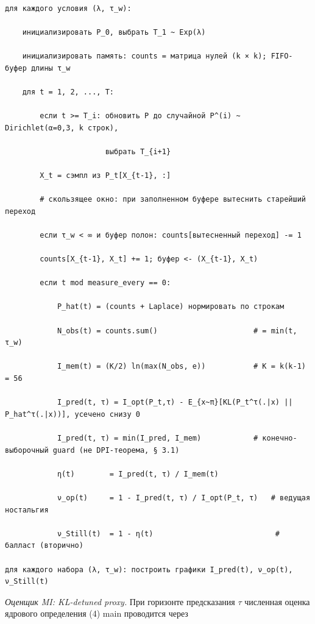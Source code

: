 \documentclass[pdflatex,sn-mathphys-ay]{sn-jnl}
\begin{document}
\begingroup\footnotesize\linespread{1}\selectfont
\begin{Verbatim}[breaklines=true]

для каждого условия (λ, τ_w):

    инициализировать P_0, выбрать T_1 ~ Exp(λ)

    инициализировать память: counts = матрица нулей (k × k); FIFO-буфер длины τ_w

    для t = 1, 2, ..., T:

        если t >= T_i: обновить P до случайной P^(i) ~ Dirichlet(α=0,3, k строк),

                       выбрать T_{i+1}

        X_t = сэмпл из P_t[X_{t-1}, :]

        # скользящее окно: при заполненном буфере вытеснить старейший переход

        если τ_w < ∞ и буфер полон: counts[вытесненный переход] -= 1

        counts[X_{t-1}, X_t] += 1; буфер <- (X_{t-1}, X_t)

        если t mod measure_every == 0:

            P_hat(t) = (counts + Laplace) нормировать по строкам

            N_obs(t) = counts.sum()                      # = min(t, τ_w)

            I_mem(t) = (K/2) ln(max(N_obs, e))           # K = k(k-1) = 56

            I_pred(t, τ) = I_opt(P_t,τ) - E_{x~π}[KL(P_t^τ(.|x) || P_hat^τ(.|x))], усечено снизу 0

            I_pred(t, τ) = min(I_pred, I_mem)            # конечно-выборочный guard (не DPI-теорема, § 3.1)

            η(t)        = I_pred(t, τ) / I_mem(t)

            ν_op(t)     = 1 - I_pred(t, τ) / I_opt(P_t, τ)   # ведущая ностальгия

            ν_Still(t)  = 1 - η(t)                            # балласт (вторично)

для каждого набора (λ, τ_w): построить графики I_pred(t), ν_op(t), ν_Still(t)

\end{Verbatim}
\endgroup



\emph{Оценщик MI: KL-detuned proxy.} При горизонте предсказания \(\tau\) численная оценка ядрового определения (4) main проводится через
\end{document}

